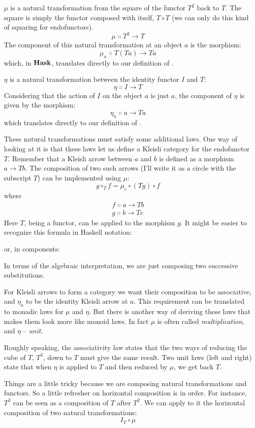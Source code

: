 $\mu$ is a natural transformation from the square of the functor $T^2$
back to $T$. The square is simply the functor composed with
itself, $T \circ T$ (we can only do this kind of squaring for
endofunctors).
\[\mu \Colon T^2 \to T\]
The component of this natural transformation at an object $a$ is
the morphism:
\[\mu_a \Colon T (T a) \to T a\]
which, in $\mathbf{Hask}$, translates directly to our definition of
.

$\eta$ is a natural transformation between the identity functor $I$
and $T$:
\[\eta \Colon I \to T\]
Considering that the action of $I$ on the object $a$ is
just $a$, the component of $\eta$ is given by the morphism:
\[\eta_a \Colon a \to T a\]
which translates directly to our definition of .

These natural transformations must satisfy some additional laws. One way
of looking at it is that these laws let us define a Kleisli category for
the endofunctor $T$. Remember that a Kleisli arrow between
$a$ and $b$ is defined as a morphism
$a \to T b$. The composition of two such arrows
(I'll write it as a circle with the subscript $T$) can be
implemented using $\mu$:
\[g \circ_T f = \mu_c \circ (T g) \circ f\]
where
\begin{gather*}
	f \Colon a \to T b \\
	g \Colon b \to T c
\end{gather*}
Here $T$, being a functor, can be applied to the morphism
$g$. It might be easier to recognize this formula in Haskell
notation:

or, in components:

In terms of the algebraic interpretation, we are just composing two
successive substitutions.

For Kleisli arrows to form a category we want their composition to be
associative, and $\eta_a$ to be the identity Kleisli arrow at
$a$. This requirement can be translated to monadic laws for $\mu$ and
$\eta$. But there is another way of deriving these laws that makes them look
more like monoid laws. In fact $\mu$ is often called
\emph{multiplication}, and $\eta$ -- \emph{unit}.

Roughly speaking, the associativity law states that the two ways of
reducing the cube of $T$, $T^3$, down to $T$ must
give the same result. Two unit laws (left and right) state that when
$\eta$ is applied to $T$ and then reduced by $\mu$, we
get back $T$.

Things are a little tricky because we are composing natural
transformations and functors. So a little refresher on horizontal
composition is in order. For instance, $T^3$ can be seen as a
composition of $T$ after $T^2$. We can apply to it the
horizontal composition of two natural transformations:
\[I_T \circ \mu\]

